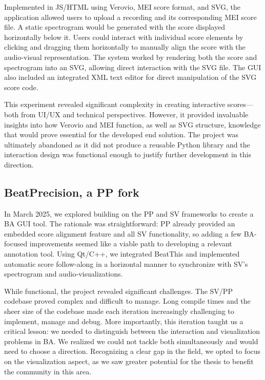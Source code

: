 Implemented in JS/HTML using Verovio, MEI score format, and SVG, the application allowed users to upload a recording and its corresponding MEI score file. A static spectrogram would be generated with the score displayed horizontally below it. Users could interact with individual score elements by clicking and dragging them horizontally to manually align the score with the audio-visual representation. The system worked by rendering both the score and spectrogram into an SVG, allowing direct interaction with the SVG file. The GUI also included an integrated XML text editor for direct manipulation of the SVG score code.

This experiment revealed significant complexity in creating interactive scores—both from UI/UX and technical perspectives. However, it provided invaluable insights into how Verovio and MEI function, as well as SVG structure, knowledge that would prove essential for the developed end solution. The project was ultimately abandoned as it did not produce a reusable Python library and the interaction design was functional enough to justify further development in this direction. 

\subsection{BeatPrecision, a PP fork}
In March 2025, we explored building on the PP and SV frameworks to create a BA GUI tool. The rationale was straightforward: PP already provided an embedded score alignment feature and all SV functionality, so adding a few BA-focused improvements seemed like a viable path to developing a relevant annotation tool. Using Qt/C++, we integrated BeatThis and implemented automatic score follow-along in a horizontal manner to synchronize with SV's spectrogram and audio-visualizations.

While functional, the project revealed significant challenges. The SV/PP codebase proved complex and difficult to manage. Long compile times and the sheer size of the codebase made each iteration increasingly challenging to implement, manage and debug. More importantly, this iteration taught us a critical lesson: we needed to distinguish between the interaction and visualization problems in BA. We realized we could not tackle both simultaneously and would need to choose a direction. Recognizing a clear gap in the field, we opted to focus on the visualization aspect, as we saw greater potential for the thesis to benefit the community in this area. 

